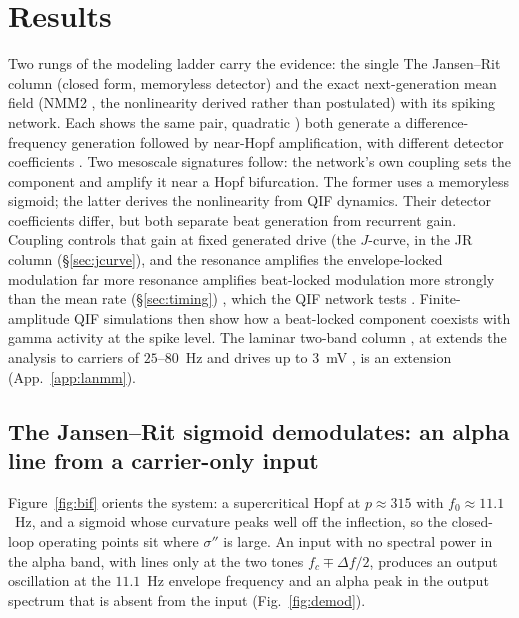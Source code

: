 \documentclass[11pt,a4paper]{article}
\newcommand{\Sig}{\sigma}
\providecommand{\DIFaddtex}[1]{{\protect\color{blue} \sf #1}} %
\providecommand{\DIFdeltex}[1]{{\protect\color{red} \scriptsize #1}} %
\providecommand{\DIFaddbegin}{} %
\providecommand{\DIFaddend}{} %
\providecommand{\DIFdelbegin}{} %
\providecommand{\DIFdelend}{} %
\providecommand{\DIFadd}[1]{\texorpdfstring{\DIFaddtex{#1}}{#1}} %
\providecommand{\DIFdel}[1]{\texorpdfstring{\DIFdeltex{#1}}{}} %
\begin{document}
\section{Results}
\DIFdelbegin \DIFdel{Two rungs of the modeling ladder carry the evidence: the single }\DIFdelend \DIFaddbegin \DIFadd{The }\DIFaddend Jansen--Rit column \DIFdelbegin \DIFdel{(closed form, memoryless detector) }\DIFdelend and the exact next-generation mean field (NMM2\DIFdelbegin \DIFdel{, the
nonlinearity derived rather than postulated) with its spiking network. Each shows the same
pair, quadratic }\DIFdelend \DIFaddbegin \DIFadd{) both generate a
}\DIFaddend difference-frequency \DIFdelbegin \DIFdel{generation followed by near-Hopf amplification, with
different detector coefficients . Two mesoscale signatures follow: the network's own
coupling sets the }\DIFdelend \DIFaddbegin \DIFadd{component and amplify it near a Hopf bifurcation. The former uses
a memoryless sigmoid; the latter derives the nonlinearity from QIF dynamics. Their
detector coefficients differ, but both separate beat generation from recurrent gain.
Coupling controls that }\DIFaddend gain at fixed generated drive \DIFdelbegin \DIFdel{(the $J$-curve, }\DIFdelend \DIFaddbegin \DIFadd{in the JR column
(}\DIFaddend \S\ref{sec:jcurve}), and \DIFdelbegin \DIFdel{the resonance amplifies the envelope-locked modulation far more }\DIFdelend \DIFaddbegin \DIFadd{resonance amplifies beat-locked modulation more strongly }\DIFaddend than
the mean rate (\S\ref{sec:timing})\DIFdelbegin \DIFdel{, which the QIF network tests }\DIFdelend \DIFaddbegin \DIFadd{. Finite-amplitude QIF simulations then show how a
beat-locked component coexists with gamma activity }\DIFaddend at the spike level. The laminar
two-band column \DIFdelbegin \DIFdel{, at }\DIFdelend \DIFaddbegin \DIFadd{extends the analysis to }\DIFaddend carriers of $25$--$80$~Hz and drives up to
$3$~mV \DIFdelbegin \DIFdel{, is an extension
}\DIFdelend (App.~\ref{app:lanmm}).

\subsection{The Jansen--Rit sigmoid demodulates: an alpha line from a carrier-only input}
Figure~\ref{fig:bif} orients the system: a supercritical Hopf at
$p\!\approx\!315$ with $f_0\!\approx\!11.1$~Hz, and a sigmoid whose curvature peaks
well off the inflection, so the closed-loop operating points sit where $\Sig''$ is
large. An input with no spectral power in the alpha band, with lines only at the two
tones $f_c\mp\Delta f/2$, produces an output oscillation at the $11.1$~Hz envelope
frequency and an alpha peak in the output spectrum that is absent from the input
(Fig.~\ref{fig:demod}).
\end{document}
